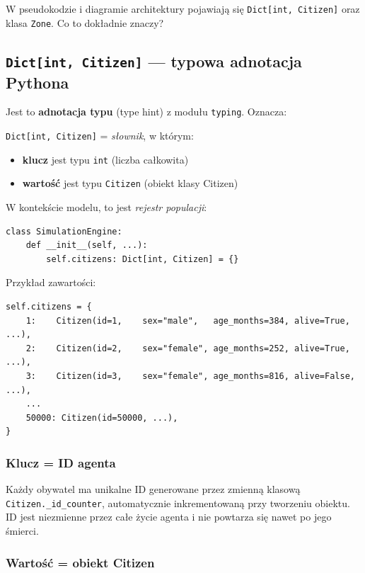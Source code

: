\documentclass[11pt,a4paper]{article}
\begin{document}
\begin{qbox}
W pseudokodzie i diagramie architektury pojawiają się \texttt{Dict[int, Citizen]} oraz klasa \texttt{Zone}. Co to dokładnie znaczy?
\end{qbox}

\subsection{\texttt{Dict[int, Citizen]} --- typowa adnotacja Pythona}

Jest to \textbf{adnotacja typu} (type hint) z modułu \texttt{typing}. Oznacza:

\begin{formulabox}
\texttt{Dict[int, Citizen]} = \emph{słownik}, w którym:
\begin{itemize}
  \item \textbf{klucz} jest typu \texttt{int} (liczba całkowita)
  \item \textbf{wartość} jest typu \texttt{Citizen} (obiekt klasy Citizen)
\end{itemize}
\end{formulabox}

W kontekście modelu, to jest \emph{rejestr populacji}:

\begin{lstlisting}
class SimulationEngine:
    def __init__(self, ...):
        self.citizens: Dict[int, Citizen] = {}
\end{lstlisting}

Przykład zawartości:
\begin{lstlisting}
self.citizens = {
    1:    Citizen(id=1,    sex="male",   age_months=384, alive=True,  ...),
    2:    Citizen(id=2,    sex="female", age_months=252, alive=True,  ...),
    3:    Citizen(id=3,    sex="female", age_months=816, alive=False, ...),
    ...
    50000: Citizen(id=50000, ...),
}
\end{lstlisting}

\subsubsection{Klucz = ID agenta}

Każdy obywatel ma unikalne ID generowane przez zmienną klasową \texttt{Citizen.\_id\_counter}, automatycznie inkrementowaną przy tworzeniu obiektu. ID jest niezmienne przez całe życie agenta i nie powtarza się nawet po jego śmierci.

\subsubsection{Wartość = obiekt Citizen}
\end{document}
